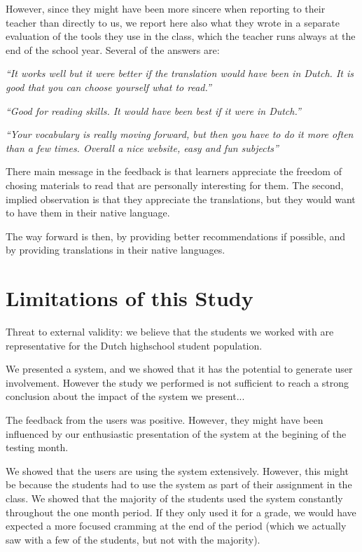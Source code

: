 However, since they might have been more sincere when reporting to their teacher than directly to us, we report here also what they wrote in a separate evaluation of the tools they use in the class, which the teacher runs always at the end of the school year. Several of the answers are: 

\begin{description}
  \item {\em ``It works well but it were better if the translation would have been in Dutch. It is good that you can choose yourself what to read.''}
  \item {\em ``Good for reading skills. It would have been best if it were in Dutch.''}
  \item {\em ``Your vocabulary is really moving forward, but then you have to do it more often than a few times. Overall a nice website, easy and fun subjects''}
\end{description}

There main message in the feedback is that learners appreciate the freedom of chosing materials to read that are personally interesting for them. The second, implied observation is that they appreciate the translations, but they would want to have them in their native language. 

The way forward is then, by providing better recommendations if possible, and by providing translations in their native languages.


\newpage
\section{Limitations of this Study}

Threat to external validity: we believe that the students we worked with are representative for the Dutch highschool student population. 

We presented a system, and we showed that it has the potential to generate user involvement. However the study we performed is not sufficient to reach a strong conclusion about the impact of the system we present... 

The feedback from the users was positive. However, they might have been influenced by our enthusiastic presentation of the system at the begining of the testing month. 

We showed that the users are using the system extensively. However, this might be because the students had to use the system as part of their assignment in the class. We showed that the majority of the students used the system constantly throughout the one month period. If they only used it for a grade, we would have expected a more focused cramming at the end of the period (which we actually saw with a few of the students, but not with the majority). 

